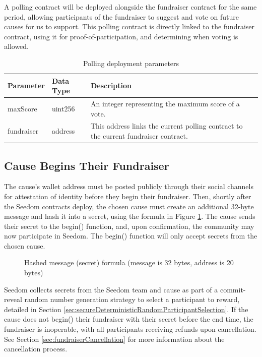 \documentclass[11pt]{article}
\begin{document}
A polling contract will be deployed alongside the fundraiser contract for the same period, allowing participants of the fundraiser to suggest and vote on future causes for us to support. This polling contract is directly linked to the fundraiser contract, using it for proof-of-participation, and determining when voting is allowed.

\begin{table}[H]
\begin{center}
\begin{tabular}{| l | l | p{32em} |}
\hline
\textbf{Parameter} & \textbf{Data Type} & \textbf{Description} \\ \hline
maxScore & uint256 & An integer representing the maximum score of a vote. \\ \hline
fundraiser & address & This address links the current polling contract to the current fundraiser contract. \\ \hline
\end{tabular}
\caption{Polling deployment parameters}
\label{tab:pollingDeploymentParameters}
\end{center}
\end{table}

\subsection{Cause Begins Their Fundraiser}

The cause's wallet address must be posted publicly through their social channels for attestation of identity before they begin their fundraiser. Then, shortly after the Seedom contracts deploy, the chosen cause must create an additional 32-byte message and hash it into a secret, using the formula in Figure \ref{figure:secretGenerationFormula}. The cause sends their secret to the begin() function, and, upon confirmation, the community may now participate in Seedom. The begin() function will only accept secrets from the chosen cause.

\begin{figure}[H]
\begin{center}
\caption{Hashed message (secret) formula (message is 32 bytes, address is 20 bytes)}
\label{figure:secretGenerationFormula}
\end{center}
\end{figure}

Seedom collects secrets from the Seedom team and cause as part of a commit-reveal random number generation strategy to select a participant to reward, detailed in Section \ref{sec:secureDeterministicRandomParticipantSelection}. If the cause does not begin() their fundraiser with their secret before the end time, the fundraiser is inoperable, with all participants receiving refunds upon cancellation. See Section \ref{sec:fundraiserCancellation} for more information about the cancellation process.
\end{document}
